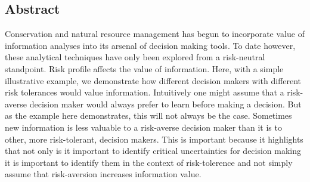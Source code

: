 
\subsection*{Abstract}\label{abstract}

Conservation and natural resource management has begun to incorporate value of information analyses into its arsenal of decision making tools. To date however, these analytical techniques have only been explored from a risk-neutral standpoint. Risk profile affects the value of information. Here, with a simple illustrative example, we demonstrate how different decision makers with different risk tolerances would value information. Intuitively one might assume that a risk-averse decision maker would always prefer to learn before making a decision. But as the example here demonstrates, this will not always be the case. Sometimes new information is less valuable to a risk-averse decision maker than it is to other, more risk-tolerant, decision makers. This is important because it highlights that not only is it important to identify critical uncertainties for decision making it is important to identify them in the context of risk-tolerence and not simply assume that risk-aversion increases information value.